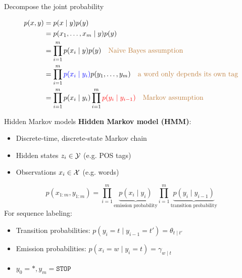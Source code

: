 \documentclass[usenames,dvipsnames,notes]{beamer}
\begin{document}
\begin{frame}
    {Decompose the joint probability}
    \begin{align*}
        p(x, y) &= p(x\mid y)p(y) \\
        &= p(x_1,\ldots,x_m \mid y)p(y) \\
        &= \prod_{i=1}^m p(x_i\mid y)p(y) \quad \text{\textcolor{brown}{Naive Bayes assumption}} \\
        &= \prod_{i=1}^m {\color{blue}p(x_i\mid y_i)}p(y_1,\ldots,y_m) \quad \text{\textcolor{brown}{a word only depends its own tag}} \\
        &= \prod_{i=1}^m p(x_i\mid y_i)\prod_{i=1}^m {\color{red}p(y_i\mid y_{i-1})} \quad \text{\textcolor{brown}{Markov assumption}}
    \end{align*}
\end{frame}

\begin{frame}
    {Hidden Markov models}
    \textbf{Hidden Markov model (HMM)}:\\
    \begin{itemize}
        \item Discrete-time, discrete-state Markov chain
        \item Hidden states $z_i \in \mathcal{Y}$ (e.g. POS tags)
        \item Observations $x_i\in \mathcal{X}$ (e.g. words)
    \end{itemize}
    $$
    p(x_{1:m},y_{1:m}) = \prod_{i=1}^m \underbrace{p(x_i\mid y_i)}_{\text{emission probability}}
    \prod_{i=1}^m \underbrace{p(y_i\mid y_{i-1})}_{\text{transition probability}}
    $$
    For sequence labeling:\\
    \begin{itemize}
        \item Transition probabilities: $p(y_i=t\mid y_{i-1}=t') = \theta_{t\mid t'}$
        \item Emission probabilities: $p(x_i=w\mid y_i=t) = \gamma_{w\mid t}$
        \item $y_0=*, y_m=\texttt{STOP}$
    \end{itemize}
\end{frame}
\end{document}
